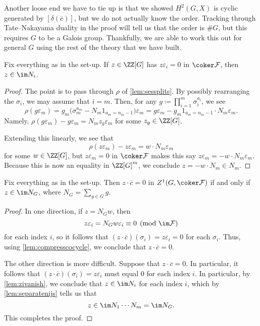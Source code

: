 \documentclass{article}
\numberwithin{equation}{section}
\begin{document}
Another loose end we have to tie up is that we showed $H^2(G,X)$ is cyclic generated by $[\delta(\overline c)]$, but we do not actually know the order. Tracking through Tate--Nakayama duality in the proof will tell us that the order is $\#G$, but this requires $G$ to be a Galois group. Thankfully, we are able to work this out for general $G$ using the rest of the theory that we have built.
\begin{lemma} \label{lem:zivanish}
	Fix everything as in the set-up. If $z\in\ZZ[G]$ has $z\varepsilon_i=0$ in $\coker\mathcal F$, then $z\in\im N_i$.
\end{lemma}
\begin{proof}
	The point is to pass through $\rho$ of \autoref{lem:sessplits}. By possibly rearranging the $\sigma_i$, we may assume that $i=m$. Then, for any $g\coloneqq\prod_{i=1}^m\sigma_i^{a_i}$, we see
	\[\rho(g\varepsilon_m)=g_m\big(\sigma_m^{a_m}-N_m1_{a_m=n_m-1}\big)\varepsilon_m=g\varepsilon_m-g_m1_{a_m=n_m-1}\cdot N_m\varepsilon_m.\]
	Namely, $\rho(g\varepsilon_m)-g\varepsilon_m=N_mz_g\varepsilon_m$ for some $z_g\in\ZZ[G]$.
	
	Extending this linearly, we see that
	\[\rho(z\varepsilon_m)-z\varepsilon_m=w\cdot N_m\varepsilon_m\]
	for some $w\in\ZZ[G]$, but $z\varepsilon_m=0$ in $\coker\mathcal F$ makes this say $z\varepsilon_m=-w\cdot N_m\varepsilon_m$. Because this is now an equality in $\ZZ[G]^m$, we conclude $z=-w\cdot N_m\in N_m$.
\end{proof}
\begin{lemma} \label{lem:computeordc}
	Fix everything as in the set-up. Then $z\cdot\overline c=0$ in $Z^1(G,\coker\mathcal F)$ if and only if $z\in\im N_G$, where $N_G=\sum_{g\in G}g$.
\end{lemma}
\begin{proof}
	In one direction, if $z=N_Gw$, then
	\[z\varepsilon_i=N_Gw\varepsilon_i\equiv0\pmod{\im\mathcal F}\]
	for each index $i$, so it follows that $(z\cdot\overline c)(\sigma_i)=z\varepsilon_i=0$ for each $\sigma_i$. Thus, using \autoref{lem:compresscocycle}, we conclude that $z\cdot\overline c=0$.

	The other direction is more difficult. Suppose that $z\cdot\overline c=0$. In particular, it follows that $(z\cdot\overline c)(\sigma_i)=z\varepsilon_i$ must equal $0$ for each index $i$. In particular, by \autoref{lem:zivanish}, we conclude that $z\in\im N_i$ for each index $i$, which by \autoref{lem:separatenijs} tells us that
	\[z\in\im N_1\cdots N_m=\im N_G.\]
	This completes the proof.
\end{proof}
\end{document}
